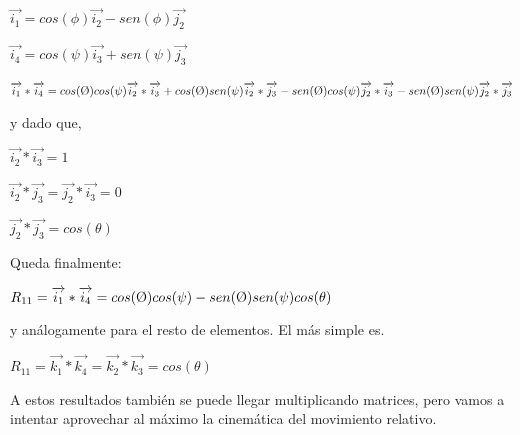 \documentclass[12pt,a4paper]{report}
\begin{document}
\begin{center}
$\overrightarrow{i_{1}}=cos(\phi)\overrightarrow{i_{2}}-sen(\phi)\overrightarrow{j_{2}}$

$\overrightarrow{i_{4}}=cos(\psi)\overrightarrow{i_{3}}+sen(\psi)\overrightarrow{j_{3}}$

$\overrightarrow{i_{1}}*\overrightarrow{i_{4}}=cos(\textrm \O)cos(\psi)\overrightarrow{i_{2}}*\overrightarrow{i_{3}}+cos(\textrm \O)sen(\psi)\overrightarrow{i_{2}}*\overrightarrow{j_{3}}-sen(\textrm\O)cos(\psi)\overrightarrow{j_{2}}*\overrightarrow{i_{3}}-sen(\textrm \O)sen(\psi)\overrightarrow{j_{2}}*\overrightarrow{j_{3}}$
\end{center}
y dado que,
\begin{center}
$\overrightarrow{i_{2}}*\overrightarrow{i_{3}}=1$

$\overrightarrow{i_{2}}*\overrightarrow{j_{3}}=\overrightarrow{j_{2}}*\overrightarrow{i_{3}}=0$

$\overrightarrow{j_{2}}*\overrightarrow{j_{3}}=cos(\theta)$

Queda finalmente:

$R_{11}=\overrightarrow{i_{1}}*\overrightarrow{i_{4}}=cos(\textrm \O)cos(\psi)-sen(\textrm\O)sen(\psi)cos(\theta)$
\end{center}

y análogamente para el resto de elementos. El más simple es.
\begin{center}
$R_{11}=\overrightarrow{k_{1}}*\overrightarrow{k_{4}}=\overrightarrow{k_{2}}*\overrightarrow{k_{3}}=cos(\theta)$
\end{center}
A estos resultados también se puede llegar multiplicando matrices, pero vamos a intentar aprovechar al máximo la cinemática del movimiento relativo.


\cite{gadea2015desarrollo}

  
\end{document}
